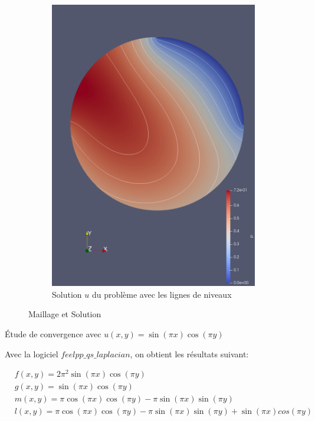 \documentclass{article}
\begin{document}
\begin{figure}[H]
\begin{subfigure}[b]{0.46\linewidth}
        \includegraphics[width=\linewidth]{data/sol_u_lignes_de_niveau.png}
        \caption{Solution $u$ du problème avec les lignes de niveaux}
        \label{fig:B}
    \end{subfigure}
    \caption{Maillage et Solution}
    \label{fig:roc_curve}
\end{figure}


\begin{question}
	Étude de convergence avec $ u(x,y)=\sin(\pi x) \cos(\pi y) $
\end{question}

Avec la logiciel $feelpp\_qs\_laplacian$, on obtient les résultats suivant:

\begin{align*}
	&f(x,y) = 2\pi^2\sin(\pi x) \cos(\pi y) \\
	&g(x,y) = \sin(\pi x) \cos(\pi y)\\
	&m(x,y) = \pi \cos(\pi x) \cos(\pi y) - \pi \sin(\pi x) \sin(\pi y)\\
	&l(x,y) = \pi \cos(\pi x) \cos(\pi y) - \pi \sin(\pi x) \sin(\pi y) + \sin(\pi x) cos(\pi y)\\
\end{align*}
\end{document}
